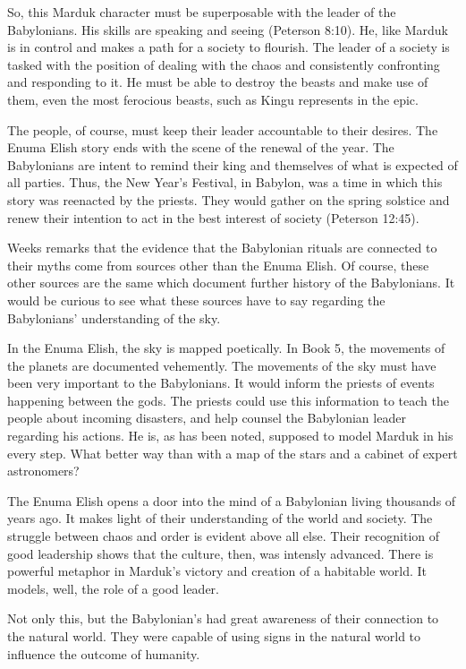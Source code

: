 \documentclass[12pt,a4paper,english]{article}
\begin{document}
So, this Marduk character must be superposable with the leader of the Babylonians.
His skills are speaking and seeing (Peterson 8:10). 
He, like Marduk is in control and makes a path for a society to flourish.
The leader of a society is tasked with the position of dealing with the chaos and consistently confronting and responding to it.
He must be able to destroy the beasts and make use of them, even the most ferocious beasts, such as Kingu represents in the epic. 

The people, of course, must keep their leader accountable to their desires. 
The Enuma Elish story ends with the scene of the renewal of the year. 
The Babylonians are intent to remind their king and themselves of what is expected of all parties. 
Thus, the New Year's Festival, in Babylon, was a time in which this story was reenacted by the priests. 
They would gather on the spring solstice and renew their intention to act in the best interest of society (Peterson 12:45).

Weeks remarks that the evidence that the Babylonian rituals are connected to their myths come from sources other than the Enuma Elish.
Of course, these other sources are the same which document further history of the Babylonians.
It would be curious to see what these sources have to say regarding the Babylonians' understanding of the sky.

In the Enuma Elish, the sky is mapped poetically. 
In Book 5, the movements of the planets are documented vehemently. 
The movements of the sky must have been very important to the Babylonians.
It would inform the priests of events happening between the gods.
The priests could use this information to teach the people about incoming disasters, and help counsel the Babylonian leader regarding his actions.
He is, as has been noted, supposed to model Marduk in his every step.
What better way than with a map of the stars and a cabinet of expert astronomers?

The Enuma Elish opens a door into the mind of a Babylonian living thousands of years ago. 
It makes light of their understanding of the world and society. 
The struggle between chaos and order is evident above all else. 
Their recognition of good leadership shows that the culture, then, was intensly advanced. 
There is powerful metaphor in Marduk's victory and creation of a habitable world. 
It models, well, the role of a good leader.

Not only this, but the Babylonian's had great awareness of their connection to the natural world. 
They were capable of using signs in the natural world to influence the outcome of humanity.
\end{document}

